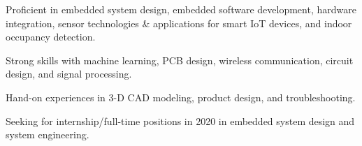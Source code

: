 

\begin{cvparagraph}

    \vspace{12pt}
\begin{cvitems}
    \setlength{\itemsep}{2pt}
    \item Proficient in embedded system design, embedded software development, hardware integration, sensor technologies \& applications for smart IoT devices, and indoor occupancy detection.
    \item Strong skills with machine learning, PCB design, wireless communication, circuit design, and signal processing.
    \item Hand-on experiences in 3-D CAD modeling, product design, and troubleshooting.
    \item Seeking for internship/full-time positions in 2020 in embedded system design and system engineering.
\end{cvitems}
\end{cvparagraph}
